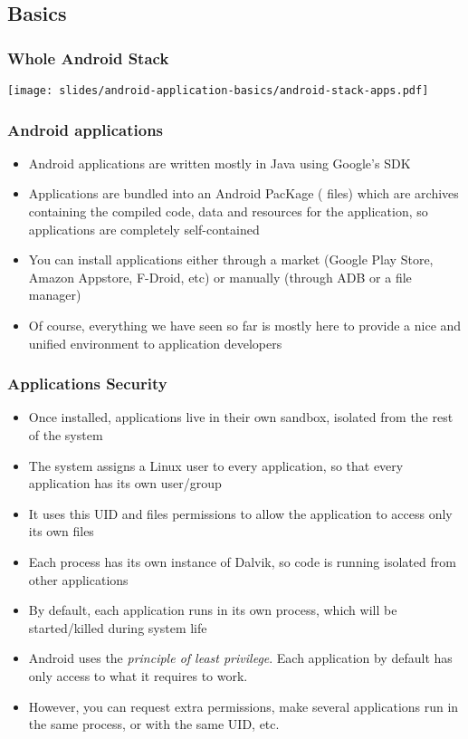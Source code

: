 \subsection{Basics}

\begin{frame}
  \frametitle{Whole Android Stack}
  \begin{center}
    \texttt{[image: slides/android-application-basics/android-stack-apps.pdf]}
  \end{center}
\end{frame}

\begin{frame}
  \frametitle{Android applications}
  \begin{itemize}
  \item Android applications are written mostly in Java using Google's
    SDK
  \item Applications are bundled into an Android PacKage (
    files) which are archives containing the compiled code, data and resources for the
    application, so applications are completely self-contained
  \item You can install applications either through a market (Google
    Play Store, Amazon Appstore, F-Droid, etc) or manually (through
    ADB or a file manager)
  \item Of course, everything we have seen so far is mostly here to
    provide a nice and unified environment to application developers
  \end{itemize}
\end{frame}

\begin{frame}
  \frametitle{Applications Security}
  \begin{itemize}
  \item Once installed, applications live in their own sandbox,
    isolated from the rest of the system
  \item The system assigns a Linux user to every application, so that
    every application has its own user/group
  \item It uses this UID and files permissions to allow  the application
    to access only its own files 
  \item Each process has its own instance of Dalvik, so code is
    running isolated from other applications
  \item By default, each application runs in its own process, which
    will be started/killed during system life
  \item Android uses the \emph{principle of least privilege}. Each
    application by default has only access to what it requires to work.
  \item However, you can request extra permissions, make several
    applications run in the same process, or with the same UID, etc.
  \end{itemize}
\end{frame}

